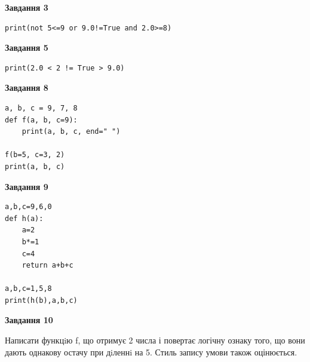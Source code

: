 \documentclass[12pt, ukrainian]{article}
\begin{document}
{\begin {large}
\begin{minipage}[t]{7.5cm}
\end{minipage}
\vline \hspace{6mm}
\begin{minipage}[t]{10.5cm}

\begin{center}
\textbf{Завдання 3}
\end{center}

\begin{verbatim}
print(not 5<=9 or 9.0!=True and 2.0>=8)
\end{verbatim}



\begin{center}
\textbf{Завдання 5}
\end{center}

\begin{verbatim}
print(2.0 < 2 != True > 9.0)
\end{verbatim}



\begin{center}
\textbf{Завдання 8}
\end{center}

\begin{verbatim}
a, b, c = 9, 7, 8
def f(a, b, c=9):
    print(a, b, c, end=" ")

f(b=5, c=3, 2)
print(a, b, c)
\end{verbatim}



\begin{center}
\textbf{Завдання 9}
\end{center}

\begin{verbatim}
a,b,c=9,6,0
def h(a):
    a=2
    b*=1
    c=4
    return a+b+c

a,b,c=1,5,8
print(h(b),a,b,c)
\end{verbatim}



\begin{center}
\textbf{Завдання 10}
\end{center}

Написати функцiю f, що отримує 2 числа і повертає логічну ознаку того, що вони дають однакову остачу при дiленнi на 5. Стиль запису умови також оцінюється.\par

\end{minipage}

\end {large}}
\newpage
\end{document}
